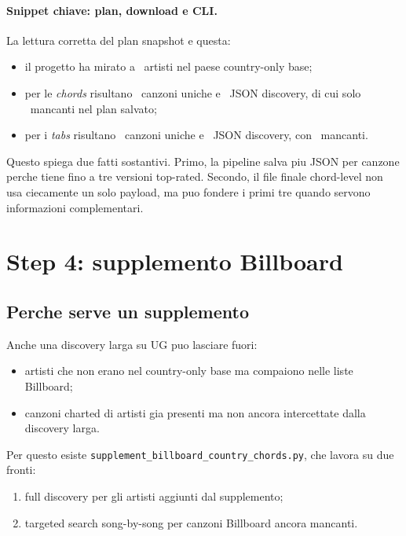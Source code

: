 \documentclass[11pt]{article}
\begin{document}
\paragraph{Snippet chiave: plan, download e CLI.}




La lettura corretta del plan snapshot e questa:
\begin{itemize}[leftmargin=2em]
\item il progetto ha mirato a \UgArtistsTargeted\ artisti nel paese country-only base;
\item per le \emph{chords} risultano \UgChordUniqueSongs\ canzoni uniche e \UgChordJsonTotal\ JSON discovery, di cui solo \UgChordJsonMissing\ mancanti nel plan salvato;
\item per i \emph{tabs} risultano \UgTabUniqueSongs\ canzoni uniche e \UgTabJsonTotal\ JSON discovery, con \UgTabJsonMissing\ mancanti.
\end{itemize}

Questo spiega due fatti sostantivi. Primo, la pipeline salva piu JSON per canzone perche tiene fino a tre versioni top-rated. Secondo, il file finale chord-level non usa ciecamente un solo payload, ma puo fondere i primi tre quando servono informazioni complementari.

\section{Step 4: supplemento Billboard}
\subsection{Perche serve un supplemento}
Anche una discovery larga su UG puo lasciare fuori:
\begin{itemize}[leftmargin=2em]
\item artisti che non erano nel country-only base ma compaiono nelle liste Billboard;
\item canzoni charted di artisti gia presenti ma non ancora intercettate dalla discovery larga.
\end{itemize}

Per questo esiste \texttt{supplement\_billboard\_country\_chords.py}, che lavora su due fronti:
\begin{enumerate}[leftmargin=2em]
\item full discovery per gli artisti aggiunti dal supplemento;
\item targeted search song-by-song per canzoni Billboard ancora mancanti.
\end{enumerate}
\end{document}
